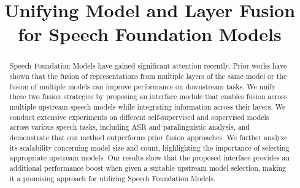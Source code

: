 \documentclass[conference]{IEEEtran}
\begin{document}
\normalsize

\title{Unifying Model and Layer Fusion for Speech Foundation Models}


\author{
}



\maketitle

\begin{abstract}
Speech Foundation Models have gained significant attention recently. Prior works have shown that the fusion of representations from multiple layers of the same model or the fusion of multiple models can improve performance on downstream tasks. We unify these two fusion strategies by proposing an interface module that enables fusion across multiple upstream speech models while integrating information across their layers. We conduct extensive experiments on different self-supervised and supervised models across various speech tasks, including ASR and paralinguistic analysis, and demonstrate that our method outperforms prior fusion approaches. We further analyze its scalability concerning model size and count, highlighting the importance of selecting appropriate upstream models. Our results show that the proposed interface provides an additional performance boost when given a suitable upstream model selection, making it a promising approach for utilizing Speech Foundation Models.
\end{abstract}
\end{document}

